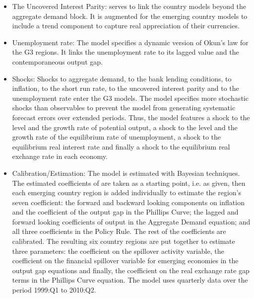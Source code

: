 \documentclass[11pt,a4paper]{article}
\begin{document}
\begin{itemize}
		\item The Uncovered Interest Parity: serves to link the country models beyond the aggregate demand block. It is augmented for the emerging country models to include a trend component to capture real appreciation of their currencies.
		\item  Unemployment rate: The model specifies a dynamic version of Okun's law for the G3 regions. It links the unemployment rate to its lagged value and the contemporaneous output gap.
		
		\item Shocks: Shocks to aggregate demand, to the bank lending conditions, to inflation, to the short run rate, to the uncovered interest parity and to the unemployment rate enter the G3 models. The model specifies more stochastic shocks than observables to prevent the model from generating systematic forecast errors over extended periods. Thus, the model features a shock to the level and the growth rate of potential output, a shock to the level and the growth rate of the equilibrium rate of unemployment, a shock to the equilibrium real interest rate and finally a shock to the equilibrium real exchange rate in each economy.
		
		\item Calibration/Estimation: The model is estimated with Bayesian techniques. The estimated coefficients of \cite{Carabenciovetal20082} are taken as a starting point, i.e. as given, then each emerging country region is added individually to estimate the region's seven coefficient: the forward and backward looking components on inflation and the coefficient of the output gap in the Phillips Curve; the lagged and forward looking coefficients of output in the Aggregate Demand equation; and all three coefficients in the Policy Rule. The rest of the coefficients are calibrated. The resulting six country regions are put together to estimate three parameters: the coefficient on the spillover activity variable, the coefficient on the financial spillover variable for emerging economies in the output gap equations and finally, the coefficient on the real exchange rate gap terms in the Phillips Curve equation.
		The model uses quarterly data over the period 1999:Q1 to 2010:Q2.
		
	\end{itemize}
\end{document}

